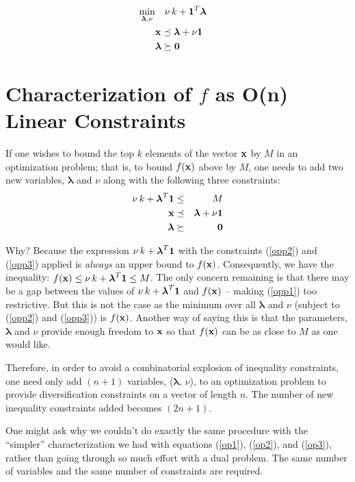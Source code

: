 \documentclass[12pt]{article}
\begin{document}
\begin{eqnarray}
	\mathop{\rm min}_{{\boldsymbol \lambda}, \nu} & \quad \nu \, k + {\bf 1}^T {\boldsymbol \lambda} & \\ 
												  &  {\bf x} \preceq {\boldsymbol \lambda} + \nu {\bf 1} & \\
												  & {\boldsymbol \lambda} \succeq {\bf 0} & 
 \end{eqnarray}

\section{Characterization of $f$ as O(n) Linear Constraints}
If one wishes to bound the top $k$ elements of the vector ${\bf x}$ by $M$ in 
an optimization problem; that is, to bound $f({\bf x})$ above by $M$, one 
needs to add two new variables, ${\boldsymbol \lambda}$ and $\nu$ along with 
the following three constraints:
\begin{eqnarray}
	\nu \, k + {\boldsymbol \lambda}^T {\bf 1}  & \le & M \label{opp1} \\ 
	{\bf x} & \preceq & {\boldsymbol \lambda} + \nu {\bf 1} \label{opp2} \\
	{\boldsymbol \lambda} & \succeq & {\bf 0}  \label{opp3}
\end{eqnarray}

Why? Because the expression $\nu \, k + {\boldsymbol \lambda}^T {\bf 1}$ with
the constraints (\ref{opp2}) and (\ref{opp3}) applied is {\it always\/} 
an upper bound to $f({\bf x})$. 
Consequently, we have the inequality: 
$f({\bf x}) \le \nu \, k + {\boldsymbol \lambda}^T {\bf 1} \le M$.
The only concern remaining is that there may be a gap between the values of 
$\nu \, k + {\boldsymbol \lambda}^T {\bf 1}$ 
and $f({\bf x})$ -- making (\ref{opp1}) too restrictive. 
But this is not the case as the minimum over all ${\boldsymbol \lambda}$ 
and $\nu$ (subject to (\ref{opp2}) and (\ref{opp3})) is $f({\bf x})$.
Another way of saying this is that the parameters, ${\boldsymbol \lambda}$ 
and $\nu$ provide enough freedom to ${\bf x}$ so that $f({\bf x})$ can be 
as close to $M$ as one would like.

Therefore, in order to avoid a combinatorial explosion of inequality constraints, 
one need only add $(n+1)$ variables, (${\boldsymbol \lambda}, \, \nu$), to an 
optimization problem to provide diversification constraints on a vector of 
length $n$. The number of new inequality constraints added becomes $(2n+1)$.

One might ask why we couldn't do exactly the same procedure with the ``simpler''
characterization we had with equations
(\ref{op1}), (\ref{op2}), and (\ref{op3}), rather than going through so much 
effort with a dual problem. The same number of variables and the same number 
of constraints are required.
\end{document}
